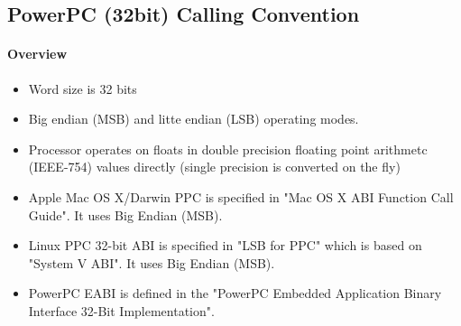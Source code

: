 %
%
%
%

\subsection{PowerPC (32bit) Calling Convention}

\paragraph{Overview}

\begin{itemize}
\item Word size is 32 bits
\item Big endian (MSB) and litte endian (LSB) operating modes.
\item Processor operates on floats in double precision floating point arithmetc (IEEE-754) values directly (single precision is converted on the fly)
\item Apple Mac OS X/Darwin PPC is specified in "Mac OS X ABI Function Call Guide"\cite{ppcMacOSX}. It uses Big Endian (MSB).
\item Linux PPC 32-bit ABI is specified in "LSB for PPC"\cite{ppc32LSB} which is based on "System V ABI". It uses Big Endian (MSB).
\item PowerPC EABI is defined in the "PowerPC Embedded Application Binary Interface 32-Bit Implementation".
\end{itemize}


